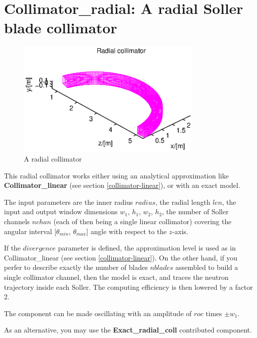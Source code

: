 \section{Collimator\_radial: A radial Soller blade collimator}


\begin{figure}
  \begin{center}
    \includegraphics[width=0.8\textwidth]{figures/radial.eps}
  \end{center}
\caption{A radial collimator}
\label{f:coll-radial}
\end{figure}

This radial collimator works either using an analytical approximation
like {\bf Collimator\_linear} (see section \ref{collimator-linear}),
or with an exact model.

The input parameters are the inner radius $radius$, the radial length $len$,
the input and output window dimensions $w_1$, $h_1$, $w_2$, $h_2$,
the number of Soller channels $nchan$
(each of then being a single linear collimator) covering the angular interval
[$\theta_{min}$, $\theta_{max}$] angle with respect to the $z$-axis.

If the $divergence$ parameter is defined,
the approximation level is used as in {\rm Collimator\_linear}
(see section \ref{collimator-linear}).
On the other hand, if you perfer to describe exactly the number of blades
$nblades$ assembled to build a single collimator channel,
then the model is exact, and traces the neutron trajectory inside each Soller.
The computing efficiency is then lowered by a factor 2.

The component can be made oscillating with an amplitude of $roc$ times
$\pm w_1$.

As an alternative, you may use the {\bf Exact\_radial\_coll} contributed component.
